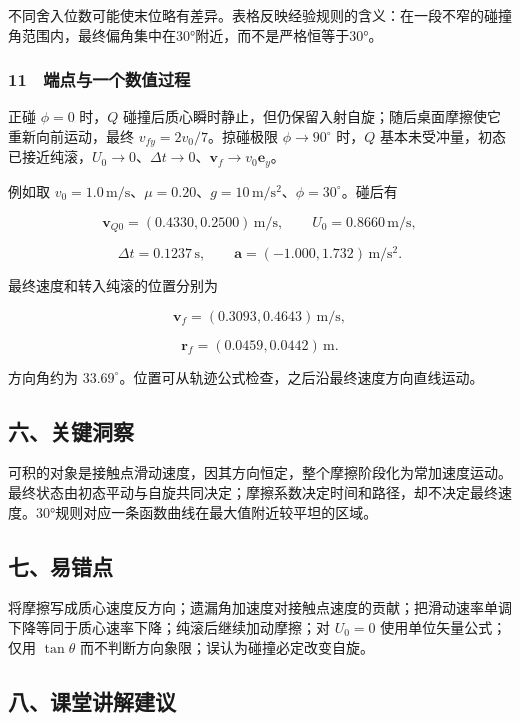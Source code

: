 \documentclass[12pt,a4paper,fontset=fandol]{ctexart}
\begin{document}
不同舍入位数可能使末位略有差异。表格反映经验规则的含义：在一段不窄的碰撞角范围内，最终偏角集中在30°附近，而不是严格恒等于30°。

\subsubsection{11　端点与一个数值过程}\label{ux7aefux70b9ux4e0eux4e00ux4e2aux6570ux503cux8fc7ux7a0b}

正碰 \(\phi=0\) 时，\(Q\)
碰撞后质心瞬时静止，但仍保留入射自旋；随后桌面摩擦使它重新向前运动，最终
\(v_{fy}=2v_0/7\)。掠碰极限 \(\phi\to90^\circ\) 时，\(Q\)
基本未受冲量，初态已接近纯滚，\(U_0\to0\)、\(\Delta t\to0\)、\(\boldsymbol v_f\to v_0\boldsymbol e_y\)。

例如取
\(v_0=1.0\,\mathrm{m/s}\)、\(\mu=0.20\)、\(g=10\,\mathrm{m/s^2}\)、\(\phi=30^\circ\)。碰后有

\[\boldsymbol v_{Q0}=(0.4330,0.2500)\,\mathrm{m/s},
\qquad U_0=0.8660\,\mathrm{m/s},\]

\[\Delta t=0.1237\,\mathrm s,
\qquad\boldsymbol a=(-1.000,1.732)\,\mathrm{m/s^2}.\]

最终速度和转入纯滚的位置分别为

\[\boldsymbol v_f=(0.3093,0.4643)\,\mathrm{m/s},\]

\[\boldsymbol r_f=(0.0459,0.0442)\,\mathrm m.\]

方向角约为
\(33.69^\circ\)。位置可从轨迹公式检查，之后沿最终速度方向直线运动。

\subsection{六、关键洞察}\label{ux516dux5173ux952eux6d1eux5bdf-1}

可积的对象是接触点滑动速度，因其方向恒定，整个摩擦阶段化为常加速度运动。最终状态由初态平动与自旋共同决定；摩擦系数决定时间和路径，却不决定最终速度。30°规则对应一条函数曲线在最大值附近较平坦的区域。

\subsection{七、易错点}\label{ux4e03ux6613ux9519ux70b9-1}

将摩擦写成质心速度反方向；遗漏角加速度对接触点速度的贡献；把滑动速率单调下降等同于质心速率下降；纯滚后继续加动摩擦；对
\(U_0=0\) 使用单位矢量公式；仅用 \(\tan\theta\)
而不判断方向象限；误认为碰撞必定改变自旋。

\subsection{八、课堂讲解建议}\label{ux516bux8bfeux5802ux8bb2ux89e3ux5efaux8bae-1}
\end{document}
